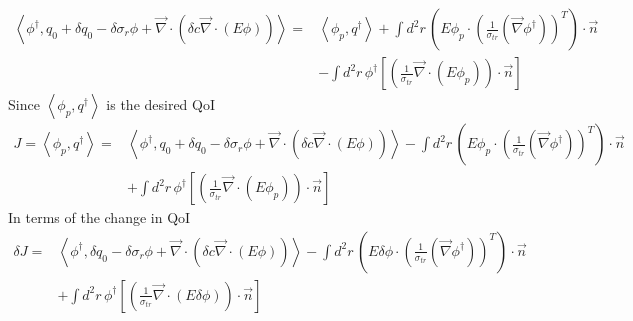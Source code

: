 \documentclass{article}
\newcommand{\bra}{\left\langle}
\newcommand{\ket}{\right\rangle}
\newcommand{\vdiv}{\vec{\nabla} \cdot}
\newcommand{\vgrad}{\vec{\nabla}}
\begin{document}
\begin{align*}
\bra \phi^\dag , q_0 + \delta q_0 - \delta \sigma_r \phi + \vdiv \left( \delta c \vdiv \left( E \phi \right) \right) \ket =& \bra \phi_p, q^\dag \ket + \int d^2 r \, \left( E \phi_p \cdot \left( \frac{1}{ \sigma_{tr}} \left(  \vgrad \phi^\dag \right) \right)^T \right) \cdot \vec{n} \\
&- \int d^2 r \, \phi^\dag \left[ \left( \frac{1}{\sigma_{tr}} \vdiv \left( E \phi_p \right) \right) \cdot \vec{n} \right]
\end{align*}
Since $\bra \phi_p, q^\dag \ket $ is the desired QoI
\begin{align*}
J = \bra \phi_p, q^\dag \ket =& \bra \phi^\dag , q_0 + \delta q_0 - \delta \sigma_r \phi + \vdiv \left( \delta c \vdiv \left( E \phi \right) \right)  \ket - \int d^2 r \, \left( E \phi_p \cdot \left( \frac{1}{ \sigma_{tr}} \left(  \vgrad \phi^\dag \right) \right)^T \right) \cdot \vec{n} \\
&+ \int d^2 r \, \phi^\dag \left[ \left( \frac{1}{\sigma_{tr}} \vdiv \left( E \phi_p \right) \right) \cdot \vec{n} \right]
\end{align*}
In terms of the change in QoI
\begin{align*}
\delta J =& \bra \phi^\dag , \delta q_0 - \delta \sigma_r \phi + \vdiv \left( \delta c \vdiv \left( E \phi \right) \right)  \ket - \int d^2 r \, \left( E \delta \phi \cdot \left( \frac{1}{ \sigma_{tr}} \left(  \vgrad \phi^\dag \right) \right)^T \right) \cdot \vec{n} \\
&+ \int d^2 r \, \phi^\dag \left[ \left( \frac{1}{\sigma_{tr}} \vdiv \left( E \delta \phi \right) \right) \cdot \vec{n} \right]
\end{align*}
\end{document}
